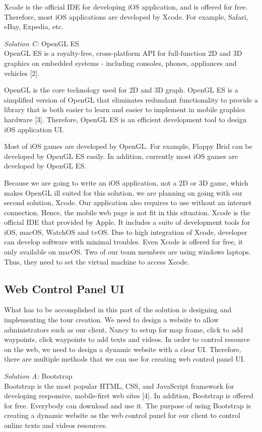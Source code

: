 \documentclass[letterpaper, 10pt,titlepage]{article}
\begin{document}
Xcode is the official IDE for developing iOS application, and is offered for free. Therefore, most iOS applications are developed by Xcode. For example, Safari, eBay, Expedia, etc.


\textit{Solution C:} OpenGL ES\\
OpenGL ES is a royalty-free, cross-platform API for full-function 2D and 3D graphics on embedded systems - including consoles, phones, appliances and vehicles [2]. 


OpenGL is the core technology used for 2D and 3D graph. OpenGL ES is a simplified version of OpenGL that eliminates redundant functionality to provide a library that is both easier to learn and easier to implement in mobile graphics hardware [3]. Therefore, OpenGL ES is an efficient development tool to design iOS application UI. 


Most of iOS games are developed by OpenGL. For example, Flappy Brid can be developed by OpenGL ES easily. In addition, currently most iOS games are developed by OpenGL ES.


Because we are going to write an iOS application, not a 2D or 3D game, which makes OpenGL ill suited for this solution, we are planning on going with our second solution, Xcode. Our application also requires to use without an internet connection. Hence, the mobile web page is not fit in this situation. Xcode is the official IDE that provided by Apple. It includes a suite of development tools for iOS, macOS, WatchOS and tvOS. Due to high integration of Xcode, developer can develop software with minimal troubles. Even Xcode is offered for free, it only available on macOS. Two of our team members are using windows laptops. Thus, they need to set the virtual machine to access Xcode.


\subsection{Web Control Panel UI}
What has to be accomplished in this part of the solution is designing and implementing the tour creation. We need to design a website to allow administrators such as our client, Nancy to setup for map frame, click to add waypoints, click waypoints to add texts and videos. In order to control resource on the web, we need to design a dynamic website with a clear UI. Therefore, there are multiple methods that we can use for creating web control panel UI.



\textit{Solution A:} Bootstrap\\
Bootstrap is the most popular HTML, CSS, and JavaScript framework for developing responsive, mobile-first web sites [4]. In addition, Bootstrap is offered for free. Everybody can download and use it. The purpose of using Bootstrap is creating a dynamic website as the web control panel for our client to control online texts and videos resources. 
\end{document}
